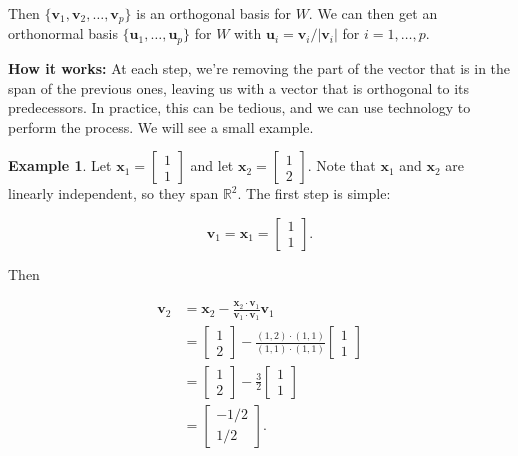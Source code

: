 \documentclass[
]{book}
\theoremstyle{definition}
\theoremstyle{definition}
\newtheorem{example}{Example}[chapter]
\theoremstyle{definition}
\theoremstyle{definition}
\theoremstyle{remark}
\begin{document}
Then \(\{\mathbf{v}_1,\mathbf{v}_2,\dots,\mathbf{v}_p\}\) is an orthogonal basis for \(W\). We can then get an orthonormal basis \(\{\mathbf{u}_1,\dots,\mathbf{u}_p\}\) for \(W\) with \(\mathbf{u}_i=\mathbf{v}_i/|\mathbf{v}_i|\) for \(i=1,\dots,p.\)

\textbf{How it works:} At each step, we're removing the part of the vector that is in the span of the previous ones, leaving us with a vector that is orthogonal to its predecessors. In practice, this can be tedious, and we can use technology to perform the process.
We will see a small example.

\begin{examplebox}

\begin{example}
\protect\hypertarget{exm:GS}{}\label{exm:GS}Let \(\mathbf{x}_1=\begin{bmatrix}1\\1\end{bmatrix}\) and let \(\mathbf{x}_2=\begin{bmatrix}1\\2\end{bmatrix}\). Note that \(\mathbf{x}_1\) and \(\mathbf{x}_2\) are linearly independent, so they span \(\mathbb{R}^2\). The first step is simple:

\[\mathbf{v}_1=\mathbf{x}_1=\begin{bmatrix}1\\1\end{bmatrix}.\]

Then

\begin{align*}
\mathbf{v}_2&=\mathbf{x}_2-\frac{\mathbf{x}_2\cdot \mathbf{v}_1}{\mathbf{v}_1\cdot\mathbf{v}_1}\mathbf{v}_1\\
&=\begin{bmatrix}1\\2\end{bmatrix}-\frac{(1,2)\cdot(1,1)}{(1,1)\cdot(1,1)}\begin{bmatrix}1\\1\end{bmatrix}\\
&=\begin{bmatrix}1\\2\end{bmatrix}-\frac{3}{2}\begin{bmatrix}1\\1\end{bmatrix}\\
&=\begin{bmatrix}-1/2\\1/2\end{bmatrix}.
\end{align*}


\end{example}
\end{examplebox}
\end{document}
